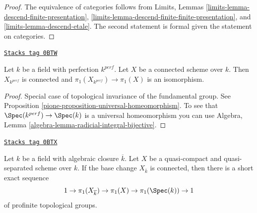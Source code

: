 \begin{proof}
The equivalence of categories follows from Limits, Lemmas
\ref{limits-lemma-descend-finite-presentation},
\ref{limits-lemma-descend-finite-finite-presentation}, and
\ref{limits-lemma-descend-etale}.
The second statement is formal given the statement on
categories.
\end{proof}

\begin{lemma}[Perfection]
\label{pione-lemma-perfection}
\href{https://stacks.math.columbia.edu/tag/0BTW}{\texttt{Stacks tag 0BTW}}

Let $k$ be a field with perfection $k^{perf}$. Let $X$ be a connected scheme
over $k$. Then $X_{k^{perf}}$ is connected and
$\pi_1(X_{k^{perf}}) \to \pi_1(X)$ is an isomorphism.
\end{lemma}

\begin{proof}

Special case of topological invariance of the fundamental group.
See Proposition \ref{pione-proposition-universal-homeomorphism}.
To see that $\Spec(k^{perf}) \to \Spec(k)$ is a universal
homeomorphism you can use
Algebra, Lemma \ref{algebra-lemma-radicial-integral-bijective}.
\end{proof}

\begin{lemma}
\label{pione-lemma-ses-field}
\href{https://stacks.math.columbia.edu/tag/0BTX}{\texttt{Stacks tag 0BTX}}

Let $k$ be a field with algebraic closure $\overline{k}$.
Let $X$ be a quasi-compact and quasi-separated scheme over $k$.
If the base change $X_{\overline{k}}$ is connected, then
there is a short exact sequence
$$
1 \to \pi_1(X_{\overline{k}}) \to \pi_1(X) \to \pi_1(\Spec(k)) \to 1
$$
of profinite topological groups.
\end{lemma}

